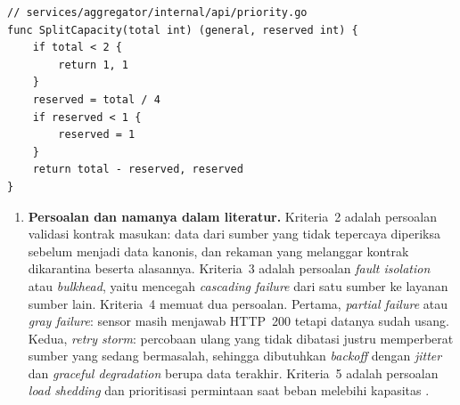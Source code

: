 \noindent\begin{minipage}{\linewidth}
\begin{lstlisting}[caption={Pembagian kapasitas umum dan cadangan prioritas.},label={code:p5-capacity}]
// services/aggregator/internal/api/priority.go
func SplitCapacity(total int) (general, reserved int) {
	if total < 2 {
		return 1, 1
	}
	reserved = total / 4
	if reserved < 1 {
		reserved = 1
	}
	return total - reserved, reserved
}
\end{lstlisting}
\end{minipage}


\begin{enumerate}
\item \textbf{Persoalan dan namanya dalam literatur.} Kriteria~2 adalah persoalan validasi kontrak masukan: data dari sumber yang tidak tepercaya diperiksa sebelum menjadi data kanonis, dan rekaman yang melanggar kontrak dikarantina beserta alasannya. Kriteria~3 adalah persoalan \emph{fault isolation} atau \emph{bulkhead}, yaitu mencegah \emph{cascading failure} dari satu sumber ke layanan sumber lain. Kriteria~4 memuat dua persoalan. Pertama, \emph{partial failure} atau \emph{gray failure}: sensor masih menjawab HTTP~200 tetapi datanya sudah usang. Kedua, \emph{retry storm}: percobaan ulang yang tidak dibatasi justru memperberat sumber yang sedang bermasalah, sehingga dibutuhkan \emph{backoff} dengan \emph{jitter} dan \emph{graceful degradation} berupa data terakhir. Kriteria~5 adalah persoalan \emph{load shedding} dan prioritisasi permintaan saat beban melebihi kapasitas \cite{kleppmann2017,sre}.


\end{enumerate}
